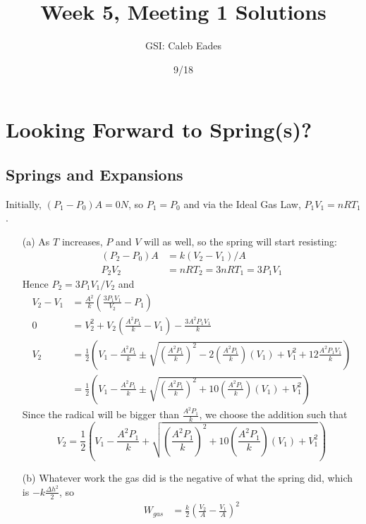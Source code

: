 \documentclass{article}
\begin{document}
\title{Week 5, Meeting 1 Solutions}
\author{GSI: Caleb Eades}
\date{9/18}
\maketitle

\section{Looking Forward to Spring(s)?}

\subsection{Springs and Expansions}

Initially, $(P_1 - P_0)A = 0 N$, so $P_1 = P_0$ and via the Ideal Gas Law, $P_1V_1 = nRT_1$.
\begin{itemize}
	\item[(a)] As $T$ increases, $P$ and $V$ will as well, so the spring will start resisting:
	\begin{align*}
	(P_2-P_0)A &= k(V_2-V_1)/A \\
	P_2V_2 &= nRT_2 = 3nRT_1 = 3P_1V_1
	\end{align*}
	Hence $P_2 = 3P_1V_1/V_2$ and
	\begin{align*}
	V_2-V_1 &= \frac{A^2}{k}\left(\frac{3P_1V_1}{V_2}-P_1\right) \\
	0 &= V_2^2+V_2\left(\frac{A^2P_1}{k}-V_1\right) - \frac{3A^2P_1V_1}{k} \\
	V_2 &= \frac{1}{2}\left(V_1-\frac{A^2P_1}{k}\pm \sqrt{\left(\frac{A^2P_1}{k}\right)^2-2\left(\frac{A^2P_1}{k}\right)(V_1) + V_1^2 + 12\frac{A^2P_1V_1}{k}}\right) \\
	&= \frac{1}{2}\left(V_1-\frac{A^2P_1}{k}\pm \sqrt{\left(\frac{A^2P_1}{k}\right)^2+10\left(\frac{A^2P_1}{k}\right)(V_1) + V_1^2}\right)
	\end{align*}
	Since the radical will be bigger than $\frac{A^2P_1}{k}$, we choose the addition such that
	\begin{equation}
	V_2 = \frac{1}{2}\left(V_1-\frac{A^2P_1}{k} + \sqrt{\left(\frac{A^2P_1}{k}\right)^2+10\left(\frac{A^2P_1}{k}\right)(V_1) + V_1^2}\right)
	\end{equation}
	\item[(b)] Whatever work the gas did is the negative of what the spring did, which is $-k\frac{\Delta h^2}{2}$, so
	\begin{align*}
	W_{gas} &= \frac{k}{2}\left(\frac{V_2}{A}-\frac{V_1}{A}\right)^2 \\

\end{align*}
\end{itemize}
\end{document}
